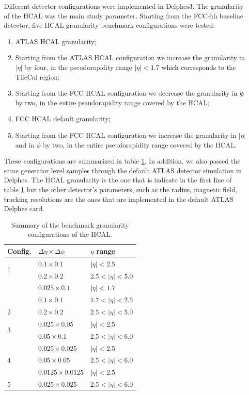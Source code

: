 Different detector configurations were implemented in Delphes3. The granularity of the HCAL was the main study parameter. Starting from the FCC-hh baseline detector, five HCAL granularity benchmark configurations were tested:
\begin{enumerate}
	\item ATLAS HCAL granularity;
	\item Starting from the ATLAS HCAL configuration we increase the granularity in $|\eta|$ by four, in the pseudorapidity range $|\eta| < 1.7$ which corresponds to the TileCal region;
	\item Starting from the FCC HCAL configuration we decrease the granularity in φ by two, in the entire pseudorapidity range covered by the HCAL;
	\item FCC HCAL default granularity;
	\item Starting from the FCC HCAL configuration we increase the granularity in $|\eta|$ and in $\phi$ by two, in the entire pseudorapidity range covered by the HCAL.
\end{enumerate}
These configurations are summarized in table \ref{table:Gran}. In addition, we also passed the same generator level samples through the default ATLAS detector simulation in Delphes. The HCAL granularity is the one that is indicate in the first line of table \ref{table:Gran} but the other detector’s parameters, such as the radius, magnetic field, tracking resolutions are the ones that are implemented in the default ATLAS Delphes card.

\begin{table}
	\centering
	\begin{tabular}{lll}
		\toprule 
		\textbf{Config.} & $\Delta \eta \times \Delta \phi$ & $\eta$ range\\
		\midrule
		\multirow{2}{*}{1} & $0.1\times 0.1$  & $|\eta|<2.5$\\
		& $0.2\times 0.2$ & $2.5<|\eta|<5.0$ \\
		\cellcolor{black!7} &\cellcolor{black!7} $0.025\times 0.1$  & \cellcolor{black!7}$|\eta|<1.7$\\
		\cellcolor{black!7} & \cellcolor{black!7}$0.1\times 0.1$  & \cellcolor{black!7}$1.7<|\eta|<2.5$\\
		\multirow{-3}{*}{2} \cellcolor{black!7}& \cellcolor{black!7}$0.2\times 0.2$  &\cellcolor{black!7} $2.5<|\eta|<5.0$\\
		\multirow{2}{*}{3 }& $0.025\times0.05$ & $|\eta|<2.5$\\
		& $0.05\times 0.1$ & $2.5<|\eta|<6.0$ \\
		\cellcolor{black!7}&  \cellcolor{black!7}$0.025\times0.025$ &  \cellcolor{black!7}$|\eta|<2.5$\\
		\multirow{-2}{*}{4}\cellcolor{black!7}&  \cellcolor{black!7}$0.05\times 0.05$ & \cellcolor{black!7} $2.5<|\eta|<6.0$ \\
		& $0.0125\times0.0125$ &$|\eta|<2.5$\\
		\multirow{-2}{*}{5 }&$0.025\times 0.025$ & $2.5<|\eta|<6.0$\\
		\bottomrule
	\end{tabular}
	\caption{Summary of the benchmark granularity configurations of the HCAL.}
	\label{table:Gran}
\end{table}

